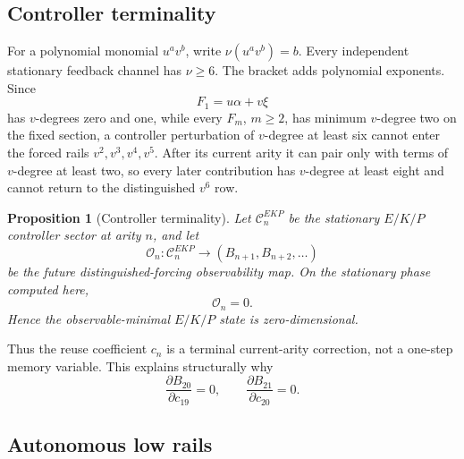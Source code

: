 \documentclass[11pt]{amsart}
\newtheorem{proposition}[theorem]{Proposition}
\begin{document}
\subsection{Controller terminality}

For a polynomial monomial $u^av^b$, write $\nu(u^av^b)=b$.  Every independent stationary feedback channel has $\nu\ge6$.  The bracket adds polynomial exponents.  Since
\[
F_1=u\alpha+v\xi
\]
has $v$-degrees zero and one, while every $F_m$, $m\ge2$, has minimum $v$-degree two on the fixed section, a controller perturbation of $v$-degree at least six cannot enter the forced rails $v^2,v^3,v^4,v^5$.  After its current arity it can pair only with terms of $v$-degree at least two, so every later contribution has $v$-degree at least eight and cannot return to the distinguished $v^6$ row.

\begin{proposition}[Controller terminality]\label{prop:controller-terminality}
Let $\mathcal C_n^{EKP}$ be the stationary $E/K/P$ controller sector at arity $n$, and let
\[
\mathcal O_n:\mathcal C_n^{EKP}\to(B_{n+1},B_{n+2},\ldots)
\]
be the future distinguished-forcing observability map.  On the stationary phase computed here,
\[
\boxed{\mathcal O_n=0.}
\]
Hence the observable-minimal $E/K/P$ state is zero-dimensional.
\end{proposition}

Thus the reuse coefficient $c_n$ is a terminal current-arity correction, not a one-step memory variable.  This explains structurally why
\[
\frac{\partial B_{20}}{\partial c_{19}}=0,
\qquad
\frac{\partial B_{21}}{\partial c_{20}}=0.
\]

\subsection{Autonomous low rails}
\end{document}
